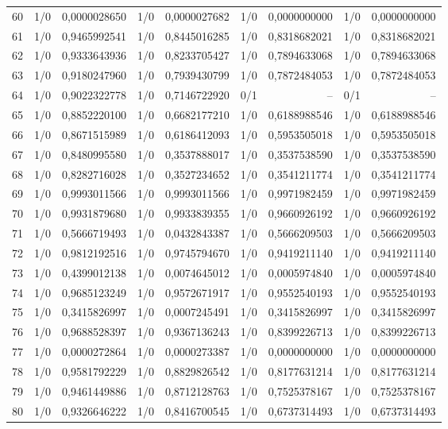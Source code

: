 \begin{longtable}{lrrrrrrrr}
60 & 1/0 & 0,0000028650 & 1/0 & 0,0000027682 & 1/0 & 0,0000000000 & 1/0 & 0,0000000000 \\
61 & 1/0 & 0,9465992541 & 1/0 & 0,8445016285 & 1/0 & 0,8318682021 & 1/0 & 0,8318682021 \\
62 & 1/0 & 0,9333643936 & 1/0 & 0,8233705427 & 1/0 & 0,7894633068 & 1/0 & 0,7894633068 \\
63 & 1/0 & 0,9180247960 & 1/0 & 0,7939430799 & 1/0 & 0,7872484053 & 1/0 & 0,7872484053 \\
64 & 1/0 & 0,9022322778 & 1/0 & 0,7146722920 & 0/1 & -- & 0/1 & -- \\
65 & 1/0 & 0,8852220100 & 1/0 & 0,6682177210 & 1/0 & 0,6188988546 & 1/0 & 0,6188988546 \\
66 & 1/0 & 0,8671515989 & 1/0 & 0,6186412093 & 1/0 & 0,5953505018 & 1/0 & 0,5953505018 \\
67 & 1/0 & 0,8480995580 & 1/0 & 0,3537888017 & 1/0 & 0,3537538590 & 1/0 & 0,3537538590 \\
68 & 1/0 & 0,8282716028 & 1/0 & 0,3527234652 & 1/0 & 0,3541211774 & 1/0 & 0,3541211774 \\
69 & 1/0 & 0,9993011566 & 1/0 & 0,9993011566 & 1/0 & 0,9971982459 & 1/0 & 0,9971982459 \\
70 & 1/0 & 0,9931879680 & 1/0 & 0,9933839355 & 1/0 & 0,9660926192 & 1/0 & 0,9660926192 \\
71 & 1/0 & 0,5666719493 & 1/0 & 0,0432843387 & 1/0 & 0,5666209503 & 1/0 & 0,5666209503 \\
72 & 1/0 & 0,9812192516 & 1/0 & 0,9745794670 & 1/0 & 0,9419211140 & 1/0 & 0,9419211140 \\
73 & 1/0 & 0,4399012138 & 1/0 & 0,0074645012 & 1/0 & 0,0005974840 & 1/0 & 0,0005974840 \\
74 & 1/0 & 0,9685123249 & 1/0 & 0,9572671917 & 1/0 & 0,9552540193 & 1/0 & 0,9552540193 \\
75 & 1/0 & 0,3415826997 & 1/0 & 0,0007245491 & 1/0 & 0,3415826997 & 1/0 & 0,3415826997 \\
76 & 1/0 & 0,9688528397 & 1/0 & 0,9367136243 & 1/0 & 0,8399226713 & 1/0 & 0,8399226713 \\
77 & 1/0 & 0,0000272864 & 1/0 & 0,0000273387 & 1/0 & 0,0000000000 & 1/0 & 0,0000000000 \\
78 & 1/0 & 0,9581792229 & 1/0 & 0,8829826542 & 1/0 & 0,8177631214 & 1/0 & 0,8177631214 \\
79 & 1/0 & 0,9461449886 & 1/0 & 0,8712128763 & 1/0 & 0,7525378167 & 1/0 & 0,7525378167 \\
80 & 1/0 & 0,9326646222 & 1/0 & 0,8416700545 & 1/0 & 0,6737314493 & 1/0 & 0,6737314493 \\

\end{longtable}
